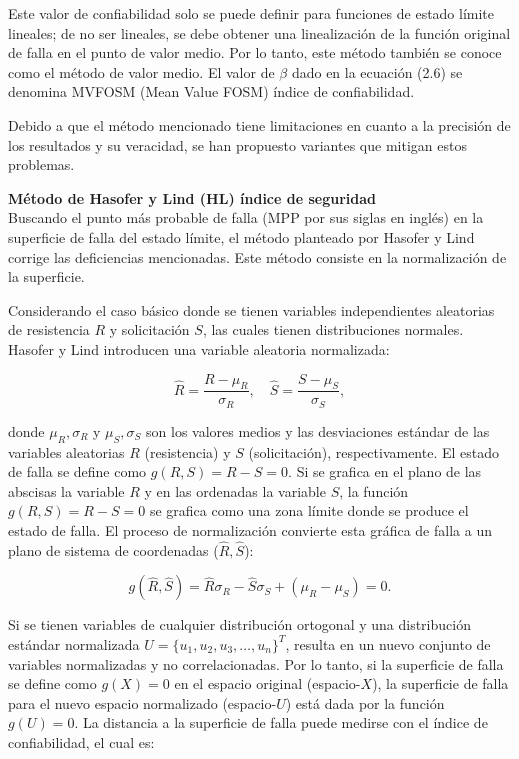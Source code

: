 Este valor de confiabilidad solo se puede definir para funciones de estado límite lineales; de no ser lineales, se debe obtener una linealización de la función original de falla en el punto de valor medio. Por lo tanto, este método también se conoce como el método de valor medio. El valor de \(\beta\) dado en la ecuación (2.6) se denomina MVFOSM (Mean Value FOSM) índice de confiabilidad.

Debido a que el método mencionado tiene limitaciones en cuanto a la precisión de los resultados y su veracidad, se han propuesto variantes que mitigan estos problemas.

\textbf{Método de Hasofer y Lind (HL) índice de seguridad}\\
Buscando el punto más probable de falla (MPP por sus siglas en inglés) en la superficie de falla del estado límite, el método planteado por Hasofer y Lind corrige las deficiencias mencionadas. Este método consiste en la normalización de la superficie.

Considerando el caso básico donde se tienen variables independientes aleatorias de resistencia \(R\) y solicitación \(S\), las cuales tienen distribuciones normales. Hasofer y Lind introducen una variable aleatoria normalizada:

\begin{equation}
\hat{R} = \frac{R - \mu_R}{\sigma_R}, \quad \hat{S} = \frac{S - \mu_S}{\sigma_S},
\end{equation}

donde \(\mu_R, \sigma_R\) y \(\mu_S, \sigma_S\) son los valores medios y las desviaciones estándar de las variables aleatorias \(R\) (resistencia) y \(S\) (solicitación), respectivamente. El estado de falla se define como \(g(R, S) = R - S = 0\). Si se grafica en el plano de las abscisas la variable \(R\) y en las ordenadas la variable \(S\), la función \(g(R, S) = R - S = 0\) se grafica como una zona límite donde se produce el estado de falla. El proceso de normalización convierte esta gráfica de falla a un plano de sistema de coordenadas (\(\hat{R}, \hat{S}\)):

\begin{equation}
g(\hat{R}, \hat{S}) = \hat{R} \sigma_R - \hat{S} \sigma_S + (\mu_R - \mu_S) = 0.
\end{equation}

Si se tienen variables de cualquier distribución ortogonal y una distribución estándar normalizada \(U = \{u_1, u_2, u_3, \dots, u_n\}^T\), resulta en un nuevo conjunto de variables normalizadas y no correlacionadas. Por lo tanto, si la superficie de falla se define como \(g(X) = 0\) en el espacio original (espacio-\(X\)), la superficie de falla para el nuevo espacio normalizado (espacio-\(U\)) está dada por la función \(g(U) = 0\). La distancia a la superficie de falla puede medirse con el índice de confiabilidad, el cual es:

